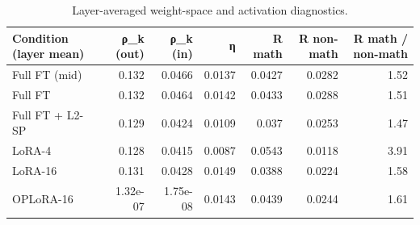 \begin{table}[t]
\centering\small
\begin{tabular}{lrrrrrr}
\toprule
Condition (layer mean) & ρ\_k (out) & ρ\_k (in) & η & R math & R non-math & R math / non-math \\
\midrule
Full FT (mid) & 0.132 & 0.0466 & 0.0137 & 0.0427 & 0.0282 & 1.52 \\
Full FT & 0.132 & 0.0464 & 0.0142 & 0.0433 & 0.0288 & 1.51 \\
Full FT + L2-SP & 0.129 & 0.0424 & 0.0109 & 0.037 & 0.0253 & 1.47 \\
LoRA-4 & 0.128 & 0.0415 & 0.0087 & 0.0543 & 0.0118 & 3.91 \\
LoRA-16 & 0.131 & 0.0428 & 0.0149 & 0.0388 & 0.0224 & 1.58 \\
OPLoRA-16 & 1.32e-07 & 1.75e-08 & 0.0143 & 0.0439 & 0.0244 & 1.61 \\
\bottomrule
\end{tabular}
\caption{Layer-averaged weight-space and activation diagnostics.}
\label{tab:task1_diagnostics}
\end{table}
